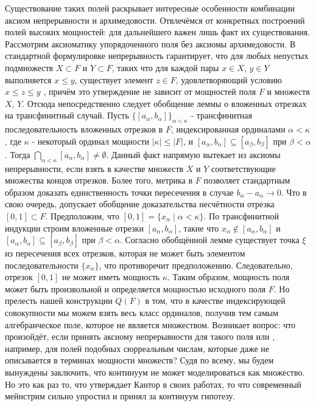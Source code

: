 \documentclass[12pt]{article}
\begin{document}
Существование таких полей раскрывает интересные особенности комбинации аксиом непрерывности и архимедовости. Отвлечёмся от конкретных построений полей высоких мощностей: для дальнейшего важен лишь факт их существования. Рассмотрим аксиоматику упорядоченного поля без аксиомы архимедовости. В стандартной формулировке непрерывность гарантирует, что для любых непустых подмножеств $X \subset F$ и $Y \subset F$, таких что для каждой пары $x \in X$, $y \in Y$ выполняется $x \leq y$, существует элемент $z \in F$, удовлетворяющий условию $x \leq z \leq y$ \cite{matan-completeness}, причём это утверждение не зависит от мощностей поля $F$ и множеств $X$, $Y$. Отсюда непосредственно следует обобщение леммы о вложенных отрезках на трансфинитный случай. Пусть $\{[a_{\alpha}, b_{\alpha}]\}_{\alpha < \kappa}$ - трансфинитная последовательность вложенных отрезков в $F$, индексированная ординалами $\alpha < \kappa$, где $\kappa$ - некоторый ординал мощности $|\kappa| \leq |F|$, и $[a_{\alpha}, b_{\alpha}] \subseteq [a_{\beta}, b_{\beta}]$ при $\beta < \alpha$. Тогда $\bigcap_{\alpha < \kappa} [a_{\alpha}, b_{\alpha}] \neq \emptyset$. Данный факт напрямую вытекает из аксиомы непрерывности, если взять в качестве множеств $X$ и $Y$ соответствующие множества концов отрезков. Более того, метрика в $F$ позволяет стандартным образом доказать единственность точки пересечения в случае $b_{\alpha} - a_{\alpha} \to 0$. Что в свою очередь, допускает обобщение доказательства несчётности отрезка $[0, 1] \subset F$. Предположим, что $[0, 1] = \{x_{\alpha} \mid \alpha < \kappa\}$. По трансфинитной индукции строим вложенные отрезки $[a_{\alpha}, b_{\alpha}]$, такие что $x_{\alpha} \notin [a_{\alpha}, b_{\alpha}]$ и $[a_{\alpha}, b_{\alpha}] \subseteq [a_{\beta}, b_{\beta}]$ при $\beta < \alpha$. Согласно обобщённой лемме существует точка $\xi$ из пересечения всех отрезков, которая не может быть элементом последовательности $\{x_{\alpha}\}$, что противоречит предположению. Следовательно, отрезок $[0, 1]$ не может иметь мощность $\kappa$. Таким образом, мощность поля может быть произвольной и определяется мощностью исходного поля $F$. Но прелесть нашей конструкции $Q(F)$ в том, что в качестве индексирующей совокупности мы можем взять весь класс ординалов, получив тем самым алгебраическое поле, которое не является множеством. Возникает вопрос: что произойдёт, если принять аксиому непрерывности для такого поля или , например, для полей подобных сюрреальным числам, которые даже не описывается в терминах мощности множеств? Судя по всему, мы будем вынуждены заключить, что континуум не может моделироваться как множество. Но это как раз то, что утверждает Кантор в своих работах, то что современный мейнстрим сильно упростил и принял за континуум гипотезу.
\end{document}
